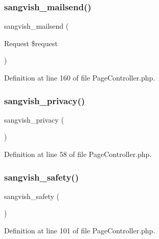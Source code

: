 \subsubsection{\texorpdfstring{sangvish\_mailsend()}{sangvish\_mailsend()}}
{\footnotesize\ttfamily sangvish\+\_\+mailsend (\begin{DoxyParamCaption}\item[{Request}]{\$request }\end{DoxyParamCaption})}



Definition at line 160 of file Page\+Controller.\+php.

\mbox{\label{class_responsive_1_1_http_1_1_controllers_1_1_page_controller_a583662bcc0643b1dd4558cf9a4f1370f}} 
\subsubsection{\texorpdfstring{sangvish\_privacy()}{sangvish\_privacy()}}
{\footnotesize\ttfamily sangvish\+\_\+privacy (\begin{DoxyParamCaption}{ }\end{DoxyParamCaption})}



Definition at line 58 of file Page\+Controller.\+php.

\mbox{\label{class_responsive_1_1_http_1_1_controllers_1_1_page_controller_a59d70f0da3d4ec506186e414debdde16}} 
\subsubsection{\texorpdfstring{sangvish\_safety()}{sangvish\_safety()}}
{\footnotesize\ttfamily sangvish\+\_\+safety (\begin{DoxyParamCaption}{ }\end{DoxyParamCaption})}



Definition at line 101 of file Page\+Controller.\+php.

\mbox{\label{class_responsive_1_1_http_1_1_controllers_1_1_page_controller_a8f0d936ee5e2c7ed629083490acc2220}} 

